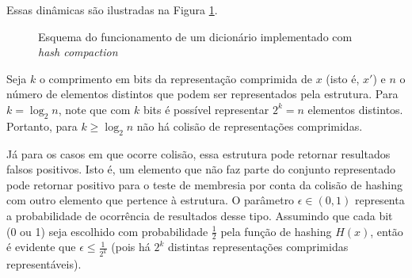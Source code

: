 \documentclass[12pt,twoside,english,brazilian]{article}
\begin{document}
Essas dinâmicas são ilustradas na Figura \ref{hash-compaction}.

\begin{figure}
    \begin{center}
        \caption{\label{hash-compaction} Esquema do funcionamento de um dicionário implementado com \textit{hash compaction}}
    \end{center}
\end{figure}

Seja $k$ o comprimento em bits da representação comprimida de $x$ (isto é, $x'$) e $n$ o número de elementos distintos que podem ser representados pela estrutura. Para $k = \log_2{n}$, note que com $k$ bits é possível representar $2^k = n$ elementos distintos. Portanto, para $k \geq \log_2{n}$ não há colisão de representações comprimidas.

Já para os casos em que ocorre colisão, essa estrutura pode retornar resultados falsos positivos. Isto é, um elemento que não faz parte do conjunto representado pode retornar positivo para o teste de membresia por conta da colisão de hashing com outro elemento que pertence à estrutura. O parâmetro $\epsilon \in (0,1)$ representa a probabilidade de ocorrência de resultados desse tipo. Assumindo que cada bit (0 ou 1) seja escolhido com probabilidade $\frac{1}{2}$ pela função de hashing $H(x)$, então é evidente que $\epsilon \leq \frac{1}{2^k}$ (pois há $2^k$ distintas representações comprimidas representáveis).
\end{document}
